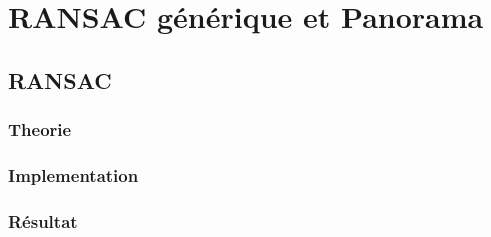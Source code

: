 \documentclass[11pt]{article}
\begin{document}
\section{RANSAC générique et Panorama}

\subsection{RANSAC}

\subsubsection{Theorie}

\subsubsection{Implementation}

\subsubsection{Résultat}
\end{document}
